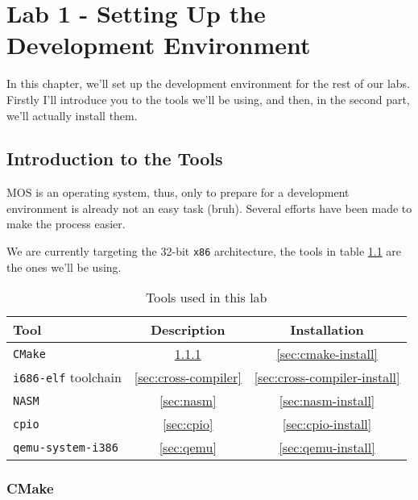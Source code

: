 \chapter{Lab 1 - Setting Up the Development Environment}

In this chapter, we'll set up the development environment for the rest of our labs. Firstly
I'll introduce you to the tools we'll be using, and then, in the second part, we'll actually
install them.

\section{Introduction to the Tools}

MOS is an operating system, thus, only to prepare for a development environment is already
not an easy task (bruh). Several efforts have been made to make the process easier.

We are currently targeting the 32-bit \texttt{x86} architecture, the tools in table \ref{tab:tools}
are the ones we'll be using.

\begin{table}[h!]
    \centering
    \begin{tabular}{|l|c|c|}
        \hline \textbf{Tool}               & \textbf{Description}     & \textbf{Installation}            \\
        \hline \texttt{CMake}              & \ref{sec:cmake}          & \ref{sec:cmake-install}          \\
        \hline \texttt{i686-elf} toolchain & \ref{sec:cross-compiler} & \ref{sec:cross-compiler-install} \\
        \hline \texttt{NASM}               & \ref{sec:nasm}           & \ref{sec:nasm-install}           \\
        \hline \texttt{cpio}               & \ref{sec:cpio}           & \ref{sec:cpio-install}           \\
        \hline \texttt{qemu-system-i386}   & \ref{sec:qemu}           & \ref{sec:qemu-install}           \\
        \hline
    \end{tabular}
    \caption{Tools used in this lab}
    \label{tab:tools}
\end{table}

\subsection{CMake} \label{sec:cmake}


